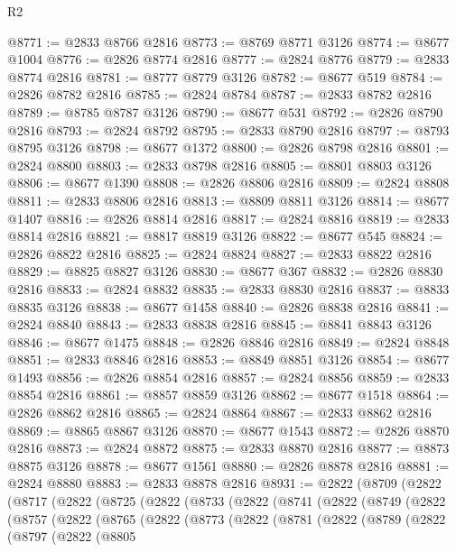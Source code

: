 \begin{lexlean}{R2}
\begin{coremodule}
@8771 := @2833 @8766 @2816
@8773 := @8769 @8771 @3126
@8774 := @8677 @1004
@8776 := @2826 @8774 @2816
@8777 := @2824 @8776
@8779 := @2833 @8774 @2816
@8781 := @8777 @8779 @3126
@8782 := @8677 @519
@8784 := @2826 @8782 @2816
@8785 := @2824 @8784
@8787 := @2833 @8782 @2816
@8789 := @8785 @8787 @3126
@8790 := @8677 @531
@8792 := @2826 @8790 @2816
@8793 := @2824 @8792
@8795 := @2833 @8790 @2816
@8797 := @8793 @8795 @3126
@8798 := @8677 @1372
@8800 := @2826 @8798 @2816
@8801 := @2824 @8800
@8803 := @2833 @8798 @2816
@8805 := @8801 @8803 @3126
@8806 := @8677 @1390
@8808 := @2826 @8806 @2816
@8809 := @2824 @8808
@8811 := @2833 @8806 @2816
@8813 := @8809 @8811 @3126
@8814 := @8677 @1407
@8816 := @2826 @8814 @2816
@8817 := @2824 @8816
@8819 := @2833 @8814 @2816
@8821 := @8817 @8819 @3126
@8822 := @8677 @545
@8824 := @2826 @8822 @2816
@8825 := @2824 @8824
@8827 := @2833 @8822 @2816
@8829 := @8825 @8827 @3126
@8830 := @8677 @367
@8832 := @2826 @8830 @2816
@8833 := @2824 @8832
@8835 := @2833 @8830 @2816
@8837 := @8833 @8835 @3126
@8838 := @8677 @1458
@8840 := @2826 @8838 @2816
@8841 := @2824 @8840
@8843 := @2833 @8838 @2816
@8845 := @8841 @8843 @3126
@8846 := @8677 @1475
@8848 := @2826 @8846 @2816
@8849 := @2824 @8848
@8851 := @2833 @8846 @2816
@8853 := @8849 @8851 @3126
@8854 := @8677 @1493
@8856 := @2826 @8854 @2816
@8857 := @2824 @8856
@8859 := @2833 @8854 @2816
@8861 := @8857 @8859 @3126
@8862 := @8677 @1518
@8864 := @2826 @8862 @2816
@8865 := @2824 @8864
@8867 := @2833 @8862 @2816
@8869 := @8865 @8867 @3126
@8870 := @8677 @1543
@8872 := @2826 @8870 @2816
@8873 := @2824 @8872
@8875 := @2833 @8870 @2816
@8877 := @8873 @8875 @3126
@8878 := @8677 @1561
@8880 := @2826 @8878 @2816
@8881 := @2824 @8880
@8883 := @2833 @8878 @2816
@8931 := @2822
    (@8709
      (@2822
        (@8717
          (@2822
            (@8725
              (@2822
                (@8733
                  (@2822
                    (@8741
                      (@2822
                        (@8749
                          (@2822
                            (@8757
                              (@2822
                                (@8765
                                  (@2822
                                    (@8773
                                      (@2822
                                        (@8781
                                          (@2822
                                            (@8789
                                              (@2822
                                                (@8797
                                                  (@2822
                                                    (@8805

\end{coremodule}
\end{lexlean}
